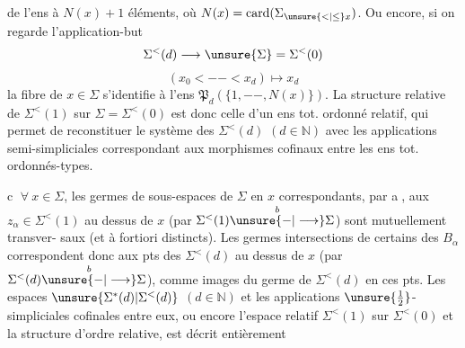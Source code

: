 de l'ens à $N(x)+1$ éléments, où $N(x)=\operatorname{card}(\Sigma_{\unsure{<|\leq}x})$.
Ou encore, si on regarde l'application-but
\[
\Sigma^{<}(d)\longrightarrow\unsure{\Sigma}=\Sigma^{<}(0)
\]
\[
(x_0<--<x_d)\longmapsto x_d
\]
la fibre de $x\in\Sigma$ s'identifie à l'ens 
$\mathfrak P_d(\{1,--,N(x)\})$.
La structure relative de $\Sigma^{<}(1)$ sur $\Sigma=\Sigma^{<}(0)$
est donc celle d'un ens tot. ordonné relatif, qui
permet de reconstituer le système des $\Sigma^{<}(d)$
 $(d\in\mathbb N)$ avec les applications semi-simpliciales
correspondant aux morphismes cofinaux entre
les ens tot. ordonnés-types.

\textcircled{c} $\forall\ x\in\Sigma$, les germes  de sous-espaces  de $\Sigma$ en $x$
correspondants, par \textcircled{a}, aux $z_\alpha\in\Sigma^{<}(1)$ au dessus
de $x$ (par $\Sigma^{<}(1)\overset{b}{\unsure{-|\longrightarrow}}\Sigma$) sont mutuellement transver-
saux (et à fortiori distincts).
Les germes intersections de certains des $B_\alpha$
correspondent donc aux pts des $\Sigma^{<}(d)$ au dessus
de $x$ (par $\Sigma^{<}(d)\overset{b}{\unsure{-|\longrightarrow}}\Sigma$), comme
images du  germe de $\Sigma^{<}(d)$ en ces pts.
Les espaces $\unsure{\Sigma^{*}(d)|\Sigma^{<}(d)}$ $(d\in\mathbb N)$ et les
applications $\unsure{\tfrac12}$-simpliciales cofinales entre eux, 
ou encore l'espace relatif $\Sigma^{<}(1)$ sur $\Sigma^{<}(0)$ et la
structure d'ordre relative, est décrit entièrement
